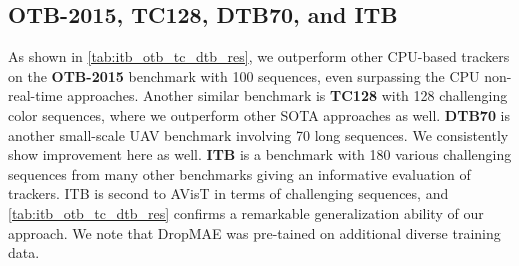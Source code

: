   \subsection{OTB-2015, TC128, DTB70, and ITB}
  As shown in \ref{tab:itb_otb_tc_dtb_res}, we outperform other CPU-based trackers on the \textbf{OTB-2015}\cite{7001050} benchmark with 100 sequences, even surpassing the CPU non-real-time approaches. 
  Another similar benchmark is \textbf{TC128}\cite{liang2015encoding} with 128 challenging color sequences, where we outperform other SOTA approaches as well. \textbf{DTB70}\cite{drone-tracking} is another small-scale UAV benchmark involving 70 long sequences. We consistently show improvement here as well. \textbf{ITB}\cite{li2021informative} is a benchmark with 180 various challenging sequences from many other benchmarks giving an informative evaluation of trackers. ITB is second to AVisT in terms of challenging sequences, and \ref{tab:itb_otb_tc_dtb_res} confirms a remarkable generalization ability of our approach. We note that DropMAE \cite{wu2023dropmae} was pre-tained on additional diverse training data.
  
  
  
